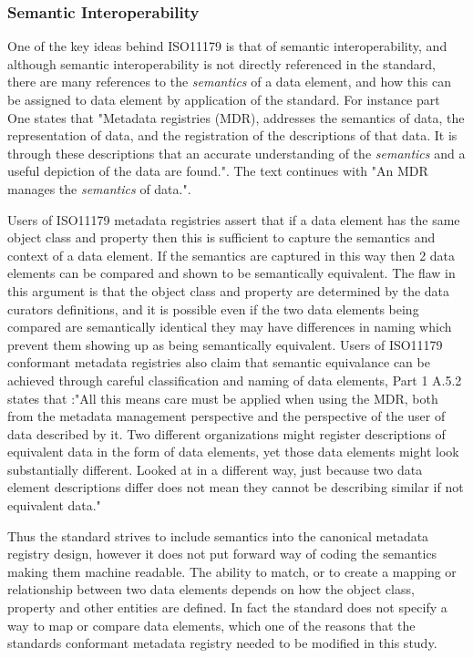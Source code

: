 \documentclass[runningheads]{llncs}
\begin{document}
\subsubsection{Semantic Interoperability}

One of the key ideas behind ISO11179 is that of semantic interoperability, and although semantic interoperability is not directly referenced in the standard, there are many references to the \emph{semantics} of a data element, and how this can be assigned to data element by application of the standard. For instance part One states that "Metadata registries (MDR), addresses the semantics of data, the representation of data, and the registration of the descriptions of that data. It is through these descriptions that an accurate understanding of the \emph{semantics} and a useful depiction of the data are found.". The text continues with "An MDR manages the \emph{semantics} of data.". 

Users of ISO11179 metadata registries assert that if a data element has the same object class and property then this is sufficient to capture the semantics and context of a data element. If the semantics are captured in this way then 2 data elements can be compared and shown to be semantically equivalent. The flaw in this argument is that the object class and property are determined by the data curators definitions, and it is possible even if the two data elements being compared are semantically identical they may have differences in naming which prevent them showing up as being semantically equivalent.  Users of ISO11179 conformant metadata registries also claim that semantic equivalance can be achieved through careful classification and naming of data elements, Part 1 A.5.2 states that :"All this means care must be applied when using the MDR, both from the metadata management perspective and the perspective of the user of data described by it. Two different organizations might register descriptions of equivalent data in the form of data elements, yet those data elements might look substantially different. Looked at in a different way, just because two data element descriptions differ does not mean they cannot be describing similar if not equivalent data." 

Thus the standard strives to include semantics into the canonical metadata registry design, however it does not put forward way of coding the semantics making them machine readable. The ability to match, or to create a mapping or relationship between two data elements depends on how the object class, property and other entities are defined. In fact the standard does not specify a way to map or compare data elements, which one of the reasons that the standards conformant metadata registry needed to be modified in this study.
\end{document}
